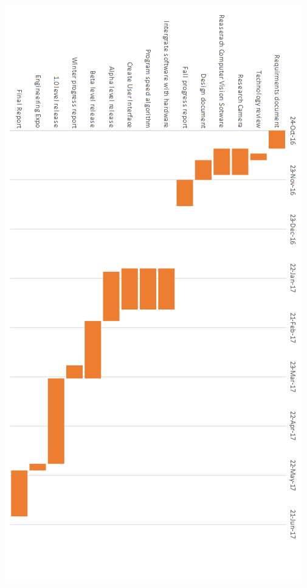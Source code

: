 \documentclass[letterpaper,10pt,onecolumn,draftclsnofoot]{IEEEtran}
\begin{document}
\newpage

\includegraphics[scale=1]{gantt}
\end{document}
